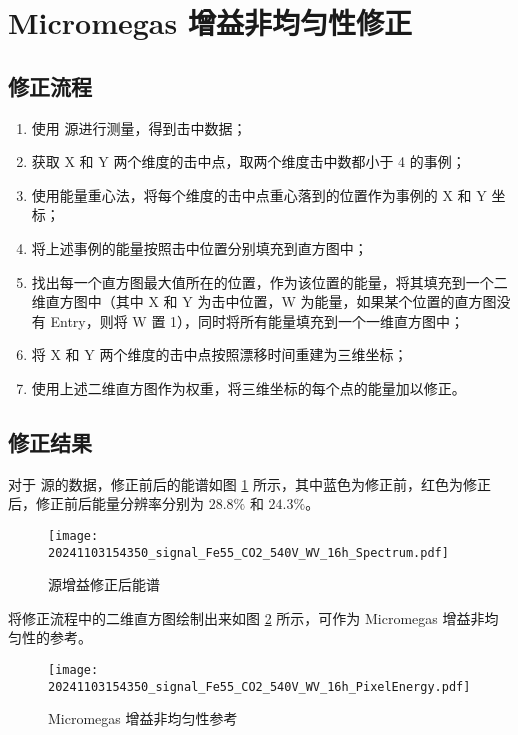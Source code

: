 \section{Micromegas 增益非均匀性修正}

\subsection{修正流程}

\begin{enumerate}
    \item 使用  源进行测量，得到击中数据；
    \item 获取 X 和 Y 两个维度的击中点，取两个维度击中数都小于 4 的事例；
    \item 使用能量重心法，将每个维度的击中点重心落到的位置作为事例的 X 和 Y 坐标；
    \item 将上述事例的能量按照击中位置分别填充到直方图中；
    \item 找出每一个直方图最大值所在的位置，作为该位置的能量，将其填充到一个二维直方图中（其中 X 和 Y 为击中位置，W 为能量，如果某个位置的直方图没有 Entry，则将 W 置 1），同时将所有能量填充到一个一维直方图中；
    \item 将 X 和 Y 两个维度的击中点按照漂移时间重建为三维坐标；
    \item 使用上述二维直方图作为权重，将三维坐标的每个点的能量加以修正。
\end{enumerate}

\subsection{修正结果}
对于  源的数据，修正前后的能谱如图 \ref{fig:Fe55EnergyFixed} 所示，其中蓝色为修正前，红色为修正后，修正前后能量分辨率分别为 $28.8\%$ 和 $24.3\%$。

\begin{figure}[htbp]
    \centering
    \texttt{[image: 20241103154350\_signal\_Fe55\_CO2\_540V\_WV\_16h\_Spectrum.pdf]}
    \caption{ 源增益修正后能谱}
    \label{fig:Fe55EnergyFixed}
\end{figure}

将修正流程中的二维直方图绘制出来如图 \ref{fig:PixelEnergyDistribution} 所示，可作为 Micromegas 增益非均匀性的参考。

\begin{figure}[htbp]
    \centering
    \texttt{[image: 20241103154350\_signal\_Fe55\_CO2\_540V\_WV\_16h\_PixelEnergy.pdf]}
    \caption{Micromegas 增益非均匀性参考}
    \label{fig:PixelEnergyDistribution}
\end{figure}


